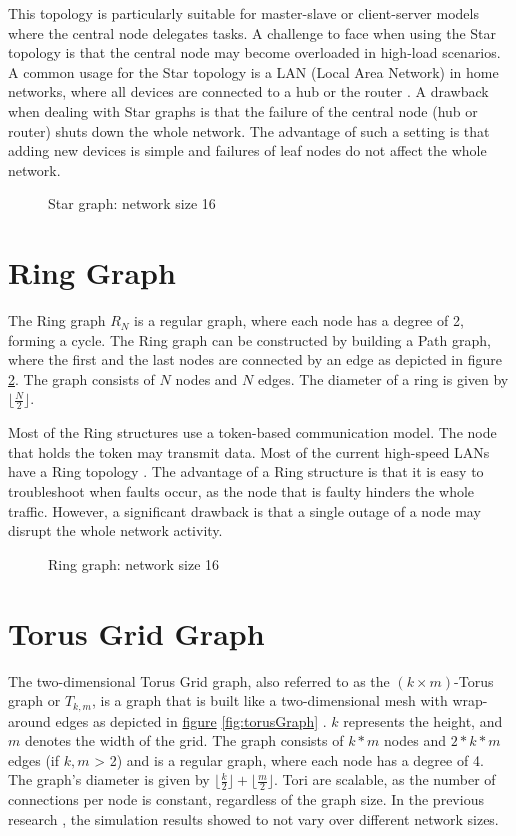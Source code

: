 This topology is particularly suitable for master-slave or client-server models where the central node delegates tasks. A challenge to face when using the Star topology is that the central node may become overloaded in high-load scenarios. A common usage for the Star topology is a LAN (Local Area Network) in home networks, where all devices are connected to a hub or the router \cite{Jayeola2023}. A drawback when dealing with Star graphs is that the failure of the central node (hub or router) shuts down the whole network. The advantage of such a setting is that adding new devices is simple and failures of leaf nodes do not affect the whole network.

\begin{figure}[H]
    \centering
    
    \caption{Star graph: network size 16}
    \label{fig:stargraphDemo}
\end{figure}

\section{Ring Graph}\label{sec:2ringgraph}
The Ring graph $R_N$ is a regular graph, where each node has a degree of 2, forming a cycle. The Ring graph can be constructed by building a Path graph, where the first and the last nodes are connected by an edge as depicted in figure \ref{fig:ring}. The graph consists of $N$ nodes and $N$ edges. The diameter of a ring is given by $\lfloor{\frac{N}{2}}\rfloor$.

Most of the Ring structures use a token-based communication model. The node that holds the token may transmit data. Most of the current high-speed LANs have a Ring topology \cite{Vidomenko1997}. The advantage of a Ring structure is that it is easy to troubleshoot when faults occur, as the node that is faulty hinders the whole traffic. However, a significant drawback is that a single outage of a node may disrupt the whole network activity.

\begin{figure}[H]
    \centering
    \scalebox{0.8}{}
    \caption{Ring graph: network size 16}
    \label{fig:ring}
\end{figure}

\section{Torus Grid Graph}\label{sec:2torusgridgraph}
The two-dimensional Torus Grid graph, also referred to as the $(k \times m)$-Torus graph or $T_{k,m}$, is a graph that is built like a two-dimensional mesh with wrap-around edges as depicted in \hyperref[fig:torusGraph]{figure} \ref{fig:torusGraph} \cite{Mahlmann2010}. $k$ represents the height, and $m$ denotes the width of the grid. The graph consists of $k * m$ nodes and $2* k * m$ edges (if $k, m$ > 2) and is a regular graph, where each node has a degree of 4. The graph's diameter is given by $\lfloor\frac{k}{2}\rfloor + \lfloor\frac{m}{2}\rfloor$. Tori are scalable, as the number of connections per node is constant, regardless of the graph size. In the previous research \cite{Bayazitoglu}, the simulation results showed to not vary over different network sizes.

